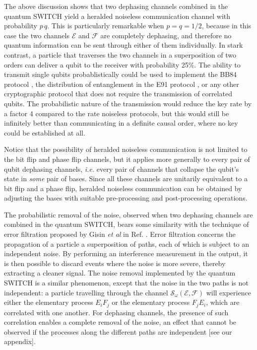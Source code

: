 \documentclass[aps,prl,twocolumn,superscriptaddress,groupedaddress]{revtex4}
\newcommand{\map}[1]{\mathcal{#1}}
\begin{document}
The above discussion shows that two dephasing channels combined in the quantum SWITCH yield a heralded noiseless communication channel with probability $p \, q$.    This is particularly remarkable when $p=q=1/2$, because in this case the two channels $\map E$ and $\map F$ are completely dephasing, and therefore no quantum information can be sent through either of them individually. In stark contrast, a particle that traverses the two channels in a superposition of two orders can deliver a qubit to the receiver with probability 25\%.    The ability to transmit single qubits probablistically could  be used to implement  the BB84 protocol \cite{BennettCh1984}, the distribution of entanglement in the E91 protocol \cite{ekert1991quantum}, or any other cryptographic protocol that does not require the transmission of correlated qubits.   The probabilistic nature of the transmission would reduce the key rate by a factor 4 compared to the rate noiseless protocols, but this would still be infinitely better than communicating in a definite causal order, where no key could be established at all. 

Notice that the possibility of heralded noiseless communication is not limited to the bit flip and phase flip channels, but it applies more generally to every pair of qubit dephasing channels, {\em i.e.} every pair of channels that collapse the qubit's state   in {\em some} pair of bases.  Since all these channels are unitarily equivalent to a bit flip and a phase flip, heralded noiseless communication can be obtained by adjusting the bases with suitable pre-processing and post-processing operations.  


 The probabilistic removal of the noise, observed when two dephasing channels are combined in the quantum SWITCH, bears some similarity with the  technique of error filtration proposed by Gisin {\em et al} in Ref.  \cite{gisin2005error}.   Error filtration concerns the propagation of a particle  a superposition of paths, each of which is subject to an independent noise.
  By performing an interference measurement in the output, it is then possible to discard  events where the noise is more severe, thereby extracting a cleaner signal.  The noise removal implemented by the quantum SWITCH is a similar phenomenon, except that the noise in the two paths is not independent:  a particle travelling through the channel  $\map S_{\omega}(\map E, \map F)$ will experience either the  elementary process $E_i F_j$ or the elementary process $F_j E_i$, which are correlated with one another.  For dephasing channels, the presence of such correlation enables a complete removal of the noise,  an effect that cannot be observed if the processes along the different paths are independent [see our appendix].  
  
\end{document}
